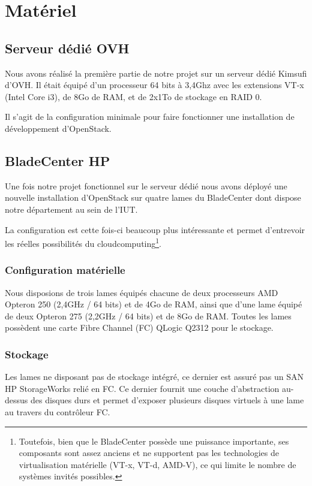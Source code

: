 \documentclass[a4paper,oneside]{report}
\begin{document}
\chapter{Matériel}

\section{Serveur dédié OVH}
Nous avons réalisé la première partie de notre projet sur un serveur dédié Kimsufi d'OVH.
Il était équipé d'un processeur 64 bits à 3,4Ghz avec les extensions VT-x (Intel Core i3), de 8Go de RAM, et de 2x1To de stockage en RAID 0.

Il s'agit de la configuration minimale pour faire fonctionner une installation de développement d'OpenStack.

\section{BladeCenter HP}
Une fois notre projet fonctionnel sur le serveur dédié nous avons déployé une nouvelle installation d'OpenStack sur quatre lames du BladeCenter dont dispose notre département au sein de l'IUT.

La configuration est cette fois-ci beaucoup plus intéressante et permet d'entrevoir les réelles possibilités du \gls{cloudcomputing}\footnote{Toutefois, bien que le BladeCenter possède une puissance importante, ses composants sont assez anciens et ne supportent pas les technologies de \gls{virtualisation} matérielle (VT-x, VT-d, AMD-V), ce qui limite le nombre de systèmes invités possibles.}.

\subsection{Configuration matérielle}
Nous disposions de trois lames équipés chacune de deux processeurs AMD Opteron 250 (2,4GHz / 64 bits) et de 4Go de RAM, ainsi que d'une lame équipé de deux Opteron 275 (2,2GHz / 64 bits) et de 8Go de RAM.\newline
Toutes les lames possèdent une carte Fibre Channel (FC) QLogic Q2312 pour le stockage.

\subsection{Stockage}
Les lames ne disposant pas de stockage intégré, ce dernier est assuré pas un SAN HP StorageWorks relié en FC.
Ce dernier fournit une couche d'abstraction au-dessus des disques durs et permet d'exposer plusieurs disques \og virtuels \fg à une lame au travers du contrôleur FC.
\end{document}
